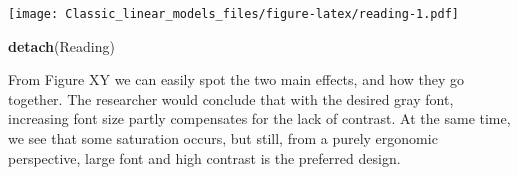 \documentclass[]{svmono}
\newenvironment{Shaded}{\begin{snugshade}}{\end{snugshade}}
\newcommand{\KeywordTok}[1]{\textcolor[rgb]{0.13,0.29,0.53}{\textbf{#1}}}
\newcommand{\DataTypeTok}[1]{\textcolor[rgb]{0.13,0.29,0.53}{#1}}
\newcommand{\DecValTok}[1]{\textcolor[rgb]{0.00,0.00,0.81}{#1}}
\newcommand{\StringTok}[1]{\textcolor[rgb]{0.31,0.60,0.02}{#1}}
\newcommand{\OperatorTok}[1]{\textcolor[rgb]{0.81,0.36,0.00}{\textbf{#1}}}
\newcommand{\NormalTok}[1]{#1}
\theoremstyle{definition}
\theoremstyle{definition}
\theoremstyle{definition}
\theoremstyle{remark}
\begin{document}
\begin{Shaded}
\end{Shaded}

\texttt{[image: Classic\_linear\_models\_files/figure-latex/reading-1.pdf]}

\begin{Shaded}
\begin{Highlighting}[]
\KeywordTok{detach}\NormalTok{(Reading)}
\end{Highlighting}
\end{Shaded}

From Figure XY we can easily spot the two main effects, and how they go
together. The researcher would conclude that with the desired gray font,
increasing font size partly compensates for the lack of contrast. At the
same time, we see that some saturation occurs, but still, from a purely
ergonomic perspective, large font and high contrast is the preferred
design.
\end{document}
